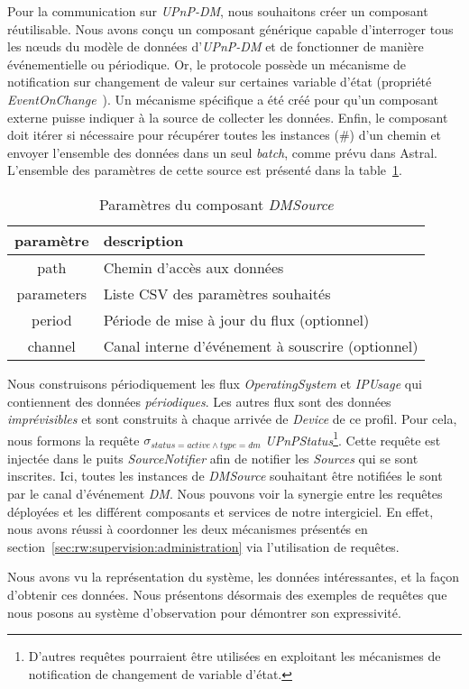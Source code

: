 Pour la communication sur \textit{UPnP-DM}, nous souhaitons créer un composant réutilisable. Nous avons conçu un composant générique capable d'interroger tous les nœuds du modèle de données d'\textit{UPnP-DM} et de fonctionner de manière événementielle ou périodique. Or, le protocole possède un mécanisme de notification sur changement de valeur sur certaines variable d'état (propriété \textit{EventOnChange}~\cite{UPnP:DM2}). Un mécanisme spécifique a été créé pour qu'un composant externe puisse indiquer à la source de collecter les données. Enfin, le composant doit itérer si nécessaire pour récupérer toutes les instances (\#) d'un chemin et envoyer l'ensemble des données dans un seul \textit{batch}, comme prévu dans Astral. L'ensemble des paramètres de cette source est présenté dans la table~\ref{tab:valid:domvision:dmsource}.

\begin{table}[ht]
    \centering
    \begin{tabular}{cl}
        paramètre & description \\ \midrule
        path & Chemin d'accès aux données \\
        parameters & Liste CSV des paramètres souhaités \\
        period & Période de mise à jour du flux (optionnel) \\
        channel & Canal interne d'événement à souscrire (optionnel)
    \end{tabular}
    \caption{Paramètres du composant \textit{DMSource}}\label{tab:valid:domvision:dmsource}
\end{table}

Nous construisons périodiquement les flux \textit{OperatingSystem} et \textit{IPUsage} qui contiennent des données \textit{périodiques}. Les autres flux sont des données \textit{imprévisibles} et sont construits à chaque arrivée de \textit{Device} de ce profil. Pour cela, nous formons la requête $\sigma_{status=active\wedge type=dm}$ \textit{UPnPStatus}\footnote{D'autres requêtes pourraient être utilisées en exploitant les mécanismes de notification de changement de variable d'état.}. Cette requête est injectée dans le puits \textit{SourceNotifier} afin de notifier les \textit{Sources} qui se sont inscrites. Ici, toutes les instances de \textit{DMSource} souhaitant être notifiées le sont par le canal d'événement \textit{DM}. Nous pouvons voir la synergie entre les requêtes déployées et les différent composants et services de notre intergiciel. En effet, nous avons réussi à coordonner les deux mécanismes présentés en section~\ref{sec:rw:supervision:administration} via l'utilisation de requêtes.

Nous avons vu la représentation du système, les données intéressantes, et la façon d'obtenir ces données. Nous présentons désormais des exemples de requêtes que nous posons au système d'observation pour démontrer son expressivité.